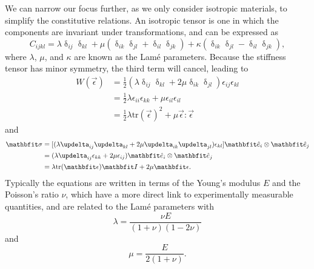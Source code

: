 We can narrow our focus further, as we only consider isotropic materials, to simplify the constitutive relations.
An isotropic tensor is one in which the components are invariant under transformations, and can be expressed as
\begin{equation}
    C_{ijkl} = \lambda \updelta_{ij} \updelta_{kl} + \mu (\updelta_{ik} \updelta_{jl} + \updelta_{il} \updelta_{jk}) + \kappa (\updelta_{ik} \updelta_{jl} - \updelta_{il} \updelta_{jk}),
\end{equation}
where $\lambda$, $\mu$, and $\kappa$ are known as the Lam\'{e} parameters.
Because the stiffness tensor has minor symmetry, the third term will cancel, leading to
\begin{align}
    W(\vec{\epsilon}) &= \frac{1}{2} (\lambda \updelta_{ij} \updelta_{kl} + 2 \mu \updelta_{ik} \updelta_{jl}) \epsilon_{ij} \epsilon_{kl} \nonumber\\
                &= \frac{1}{2} \lambda \epsilon_{ii} \epsilon_{kk} + \mu \epsilon_{il} \epsilon_{il} \nonumber\\
                &= \frac{1}{2} \lambda \textrm{tr} (\vec{\epsilon})^{2} + \mu \vec{\epsilon} : \vec{\epsilon}
\end{align}
and
\begin{align}
    \vec{\sigma} &= [ (\lambda \updelta_{ij} \updelta_{kl} + 2 \mu \updelta_{ik} \updelta_{jl} ) \epsilon_{kl}] \unitvec_{i} \otimes \unitvec_{j} \nonumber\\
                 &= (\lambda \updelta_{ij} \epsilon_{kk} + 2 \mu \epsilon_{ij}) \unitvec_{i} \otimes \unitvec_{j} \nonumber\\
                 &= \lambda \textrm{tr} (\vec{\epsilon}) \vec{I} + 2 \mu \vec{\epsilon}.
\end{align}
Typically the equations are written in terms of the Young's modulus $E$ and the Poisson's ratio $\nu$, which have a more direct link to experimentally measurable quantities, and are related to the Lam\'{e} parameters with
\begin{equation}
    \lambda = \frac{\nu E}{(1 + \nu)(1 - 2 \nu)}
\end{equation}
and
\begin{equation}
    \mu = \frac{E}{2(1 + \nu)}.
\end{equation}

